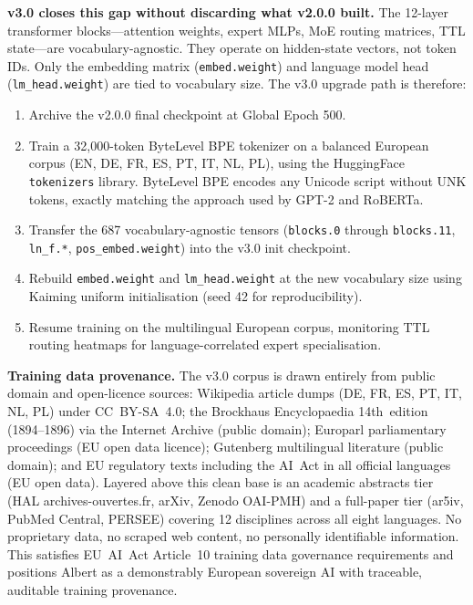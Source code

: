 \documentclass[journal,10pt,twocolumn]{IEEEtran}
\begin{document}
\textbf{v3.0 closes this gap without discarding what v2.0.0 built.}
The 12-layer transformer blocks---attention weights, expert MLPs, MoE
routing matrices, TTL state---are vocabulary-agnostic. They operate on
hidden-state vectors, not token IDs. Only the embedding matrix
(\texttt{embed.weight}) and language model head (\texttt{lm\_head.weight})
are tied to vocabulary size. The v3.0 upgrade path is therefore:

\begin{enumerate}
  \item Archive the v2.0.0 final checkpoint at Global Epoch 500.
  \item Train a 32{,}000-token ByteLevel BPE tokenizer on a balanced
        European corpus (EN, DE, FR, ES, PT, IT, NL, PL), using the
        HuggingFace \texttt{tokenizers} library. ByteLevel BPE encodes
        any Unicode script without UNK tokens, exactly matching the
        approach used by GPT-2 and RoBERTa.
  \item Transfer the 687 vocabulary-agnostic tensors (\texttt{blocks.0}
        through \texttt{blocks.11}, \texttt{ln\_f.*},
        \texttt{pos\_embed.weight}) into the v3.0 init checkpoint.
  \item Rebuild \texttt{embed.weight} and \texttt{lm\_head.weight} at the
        new vocabulary size using Kaiming uniform initialisation (seed 42
        for reproducibility).
  \item Resume training on the multilingual European corpus, monitoring TTL
        routing heatmaps for language-correlated expert specialisation.
\end{enumerate}

\textbf{Training data provenance.}
The v3.0 corpus is drawn entirely from public domain and open-licence
sources: Wikipedia article dumps (DE, FR, ES, PT, IT, NL, PL) under
CC~BY-SA~4.0; the Brockhaus Encyclopaedia 14th~edition (1894--1896) via
the Internet Archive (public domain); Europarl parliamentary proceedings
(EU open data licence); Gutenberg multilingual literature (public domain);
and EU regulatory texts including the AI~Act in all official languages
(EU open data). Layered above this clean base is an academic abstracts
tier (HAL archives-ouvertes.fr, arXiv, Zenodo OAI-PMH) and a full-paper tier
(ar5iv, PubMed Central, PERSEE) covering 12 disciplines across all eight
languages. No proprietary data, no scraped web content, no personally
identifiable information. This satisfies EU~AI~Act Article~10 training
data governance requirements and positions Albert as a demonstrably
European sovereign AI with traceable, auditable training provenance.
\end{document}

